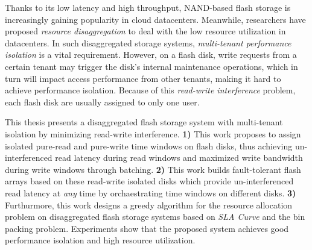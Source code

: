 \begin{abstract*}
  Thanks to its low latency and high throughput, NAND-based flash storage is increasingly gaining popularity in cloud datacenters.
  Meanwhile, researchers have proposed \textit{resource disaggregation} to deal with the low resource utilization in datacenters.
  In such disaggregated storage systems, \textit{multi-tenant performance isolation} is a vital requirement.
  However, on a flash disk, write requests from a certain tenant may trigger the disk's internal maintenance operations,
  which in turn will impact access performance from other tenants, making it hard to achieve performance isolation.
  Because of this \textit{read-write interference} problem, each flash disk are usually assigned to only one user.

  This thesis presents a disaggregated flash storage system with multi-tenant isolation by minimizing read-write interference.
  \textbf{1)} This work proposes to assign isolated pure-read and pure-write time windows on flash disks,
  thus achieving un-interferenced read latency during read windows
  and maximized write bandwidth during write windows through batching.
  \textbf{2)} This work builds fault-tolerant flash arrays based on these read-write isolated disks which provide
  un-interferenced read latency at \textit{any} time by orchaestrating time windows on different disks.
  \textbf{3)} Furthurmore, this work designs a greedy algorithm for the resource allocation problem on disaggregated flash storage systems
  based on \textit{SLA Curve} and the bin packing problem.
  Experiments show that the proposed system achieves good performance isolation and high resource utilization.
\end{abstract*}
